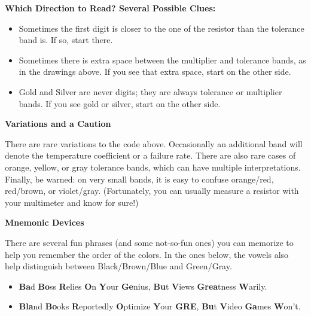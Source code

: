 \medskip
\textbf{Which Direction to Read? Several Possible Clues:}
\begin{itemize}[nosep]
\item Sometimes the first digit is closer to the one of the resistor than the tolerance band is.  If so, start there.
\item Sometimes there is extra space between the multiplier and tolerance bands, as in the drawings above.  If you see that extra space, start on the other side.
\item Gold and Silver are never digits; they are always tolerance or multiplier bands.  If you see gold or silver, start on the other side.
\end{itemize}

\medskip
\textbf{Variations and a Caution}

There are rare variations to the code above.  Occasionally an additional band will denote the temperature coefficient or a failure rate.  There are also rare cases of orange, yellow, or gray tolerance bands, which can have multiple interpretations.  Finally, be warned: on very small bands, it is easy to confuse orange/red, red/brown, or violet/gray.  (Fortunately, you can usually measure a resistor with your multimeter and know for sure!)

\medskip
\textbf{Mnemonic Devices}

There are several fun phrases (and some not-so-fun ones) you can memorize to help you remember the order of the colors.   In the ones below, the vowels also help distinguish between Black/Brown/Blue and Green/Gray.
\begin{itemize}[nosep]
\item \textbf{Ba}d \textbf{Bo}ss \textbf{R}elies \textbf{O}n \textbf{Y}our \textbf{Ge}nius, \textbf{Bu}t \textbf{V}iews \textbf{Grea}tness \textbf{W}arily.
\item \textbf{Bla}nd \textbf{Bo}oks \textbf{R}eportedly \textbf{O}ptimize \textbf{Y}our \textbf{GRE}, \textbf{Bu}t \textbf{V}ideo \textbf{Ga}mes \textbf{W}on't.
\end{itemize}

